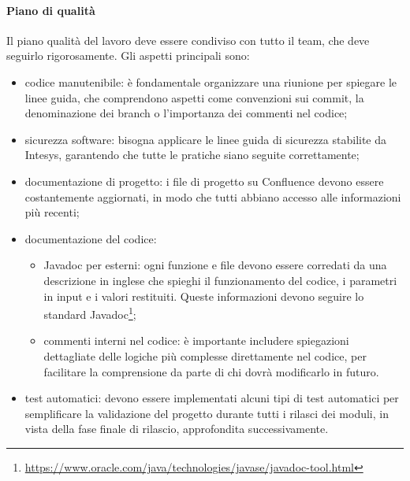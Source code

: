             \paragraph{Piano di qualità}
            Il piano qualità del lavoro deve essere condiviso con tutto il team, che deve seguirlo rigorosamente.
            Gli aspetti principali sono:
            \begin{itemize}
                \item codice manutenibile: è fondamentale organizzare una riunione per spiegare le linee guida, che comprendono aspetti
                come convenzioni sui commit, la denominazione dei branch o l'importanza dei commenti nel codice;
                \item sicurezza software: bisogna applicare le linee guida di sicurezza stabilite da Intesys, garantendo che tutte
                le pratiche siano seguite correttamente;
                \item documentazione di progetto: i file di progetto su Confluence devono essere costantemente aggiornati, in modo che tutti
                abbiano accesso alle informazioni più recenti;
                \item documentazione del codice:
                \begin{itemize}
                    \item Javadoc per esterni: ogni funzione e file devono essere corredati da una descrizione in inglese che spieghi
                    il funzionamento del codice, i parametri in input e i valori restituiti.
                    Queste informazioni devono seguire lo standard Javadoc\footnote{\url{https://www.oracle.com/java/technologies/javase/javadoc-tool.html}};
                    \item commenti interni nel codice: è importante includere spiegazioni dettagliate delle logiche più complesse
                    direttamente nel codice, per facilitare la comprensione da parte di chi dovrà modificarlo in futuro.
                \end{itemize}
                \item test automatici: devono essere implementati alcuni tipi di test automatici per semplificare la validazione
                del progetto durante tutti i rilasci dei moduli, in vista della fase finale di rilascio, approfondita successivamente.
            \end{itemize}

